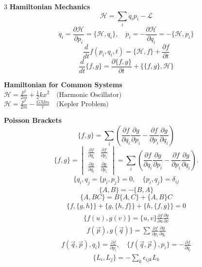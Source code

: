 \documentclass[1pt]{article}
\begin{document}
\begin{multicols}{3}
\textbf{Hamiltonian Mechanics}
\begin{equation*}
    \mathcal{H} = \sum_i \dot{q}_i p_i - \mathcal{L}
\end{equation*}
\begin{equation*}
    \dot{q}_i = \frac{\partial \mathcal{H}}{\partial p_i}=\{\mathcal{H},q_i\}, \quad \dot{p}_i = -\frac{\partial \mathcal{H}}{\partial q_i}=-\{\mathcal{H},p_i\}
\end{equation*}
\[
\frac{d}{dt} f \left( p_i, q_i, t \right) = \{ \mathcal{H}, f \} + \frac{\partial f}{\partial t}
\]
\[
\frac{d}{dt} \{ f, g \} = \frac{\partial \{ f, g \}}{\partial t} + \{ \{ f, g \}, \mathcal{H} \}
\]

\textbf{Hamiltonian for Common Systems}\\
\( \mathcal{H} = \frac{p^2}{2m} + \frac{1}{2} k x^2 \quad \text{(Harmonic Oscillator)} \)\\
\( \mathcal{H} = \frac{p^2}{2m} - \frac{GMm}{r} \quad \text{(Kepler Problem)} \)

\textbf{Poisson Brackets}
\begin{equation*}
    \{ f, g \} = \sum_i \left( \frac{\partial f}{\partial q_i} \frac{\partial g}{\partial p_i} - \frac{\partial f}{\partial p_i} \frac{\partial g}{\partial q_i} \right)
\end{equation*}
\[
\{f, g\} =
\begin{vmatrix}
\frac{\partial f}{\partial q_i} & \frac{\partial f}{\partial p_i} \\
\frac{\partial g}{\partial q_i} & \frac{\partial g}{\partial p_i}
\end{vmatrix}
= \sum_i \left( \frac{\partial f}{\partial q_i} \frac{\partial g}{\partial p_i} - \frac{\partial f}{\partial p_i} \frac{\partial g}{\partial q_i} \right).
\]
\begin{align*}
 \{   q_i, q_j = \{p_i, p_j\} = 0, \quad \{p_i, q_j\} = \delta_{ij}
\end{align*}
\begin{equation*}
    \{A, B\} = -\{B, A\}
\end{equation*}
\begin{equation*}
    \{A, BC\} = B\{A, C\} + \{A, B\}C
\end{equation*}
\begin{align*}
   \{ f, \{g,h\}\} + \{g, \{h,f\}\} + \{h, \{f,g\}\} = 0
\end{align*}
\begin{align*}
  \{  f(u), g(v)\} = \{u,v\} \frac{\partial f}{\partial u} \frac{\partial g}{\partial v}
\end{align*}
\begin{align*}
    f(\vec{p}), g(\vec{q})\} = \sum \frac{\partial f}{\partial p_i} \frac{\partial g}{\partial q_i}
\end{align*}
\begin{align*}
    f(\vec{q}, \vec{p}), q_i\} = \frac{\partial f}{\partial p_i}, \quad \{ f(\vec{q}, \vec{p}), p_i\} = -\frac{\partial f}{\partial q_i}
\end{align*}
\begin{align*}
    \{L_i, L_j\} = -\sum_k \epsilon_{ijk} L_k
\end{align*}


\end{multicols}
\end{document}
